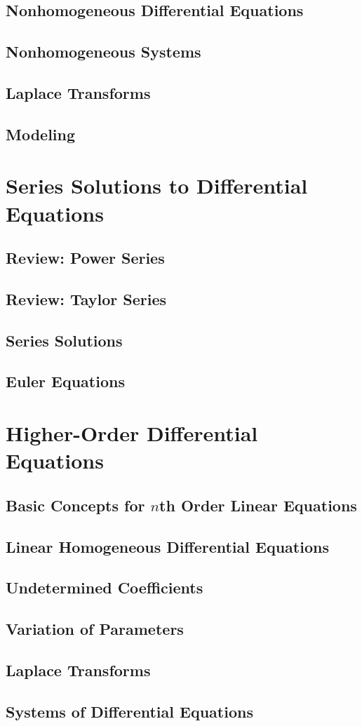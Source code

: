 \documentclass[12pt]{book}
\begin{document}
\section{Nonhomogeneous Differential Equations}
\section{Nonhomogeneous Systems}
\section{Laplace Transforms}
\section{Modeling}

\chapter{Series Solutions to Differential Equations}
\section{Review: Power Series}
\section{Review: Taylor Series}
\section{Series Solutions}
\section{Euler Equations}

\chapter{Higher-Order Differential Equations}
\section{Basic Concepts for \(n\)th Order Linear Equations}
\section{Linear Homogeneous Differential Equations}
\section{Undetermined Coefficients}
\section{Variation of Parameters}
\section{Laplace Transforms}
\section{Systems of Differential Equations}

\backmatter
\end{document}
